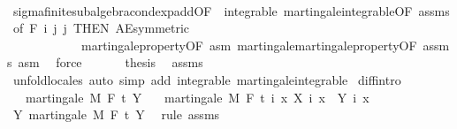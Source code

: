 \begin{isabellebody}
\ \ \ \ \ \ \isamarkupfalse%
\ sigma{\isacharunderscore}{\kern0pt}finite{\isacharunderscore}{\kern0pt}subalgebra{\isachardot}{\kern0pt}cond{\isacharunderscore}{\kern0pt}exp{\isacharunderscore}{\kern0pt}add{\isacharbrackleft}{\kern0pt}OF\ {\isacharunderscore}{\kern0pt}\ integrable\ martingale{\isachardot}{\kern0pt}integrable{\isacharbrackleft}{\kern0pt}OF\ assms{\isacharbrackright}{\kern0pt}{\isacharcomma}{\kern0pt}\ of\ {\isachardoublequoteopen}F\ i{\isachardoublequoteclose}\ j\ j{\isacharcomma}{\kern0pt}\ THEN\ AE{\isacharunderscore}{\kern0pt}symmetric{\isacharbrackright}{\kern0pt}\isanewline
\ \ \ \ \ \ \ \ \ \ \ \ martingale{\isacharunderscore}{\kern0pt}property{\isacharbrackleft}{\kern0pt}OF\ asm{\isacharbrackright}{\kern0pt}\ martingale{\isachardot}{\kern0pt}martingale{\isacharunderscore}{\kern0pt}property{\isacharbrackleft}{\kern0pt}OF\ assms\ asm{\isacharbrackright}{\kern0pt}\ \isamarkupfalse%
\ force\isanewline
\ \ \isacommand{{\isacharbraceright}{\kern0pt}}\isamarkupfalse%
\isanewline
\ \ \isamarkupfalse%
\ {\isacharquery}{\kern0pt}thesis\ \isamarkupfalse%
\ assms\isanewline
\ \ \isamarkupfalse%
\ {\isacharparenleft}{\kern0pt}unfold{\isacharunderscore}{\kern0pt}locales{\isacharparenright}{\kern0pt}\ {\isacharparenleft}{\kern0pt}auto\ simp\ add{\isacharcolon}{\kern0pt}\ integrable\ martingale{\isachardot}{\kern0pt}integrable{\isacharparenright}{\kern0pt}\isanewline
{}\isamarkupfalse%
%
\endisatagproof
{\isafoldproof}%
%
\isadelimproof
\isanewline
%
\endisadelimproof
\isanewline
{}\isamarkupfalse%
\ diff{\isacharbrackleft}{\kern0pt}intro{\isacharbrackright}{\kern0pt}{\isacharcolon}{\kern0pt}\isanewline
\ \ \ {\isachardoublequoteopen}martingale\ M\ F\ t\ Y{\isachardoublequoteclose}\isanewline
\ \ \ {\isachardoublequoteopen}martingale\ M\ F\ t\ {\isacharparenleft}{\kern0pt}{\isasymlambda}i\ x{\isachardot}{\kern0pt}\ X\ i\ x\ {\isacharminus}{\kern0pt}\ Y\ i\ x{\isacharparenright}{\kern0pt}{\isachardoublequoteclose}\isanewline
%
\isadelimproof
%
\endisadelimproof
%
\isatagproof
{}\isamarkupfalse%
\ {\isacharminus}{\kern0pt}\isanewline
\ \ \isamarkupfalse%
\ Y{\isacharcolon}{\kern0pt}\ martingale\ M\ F\ t\ Y\ \isamarkupfalse%
\ {\isacharparenleft}{\kern0pt}rule\ assms{\isacharparenright}{\kern0pt}\isanewline
\ \ \isacommand{{\isacharbraceleft}{\kern0pt}}\isamarkupfalse%
\isanewline

\end{isabellebody}
